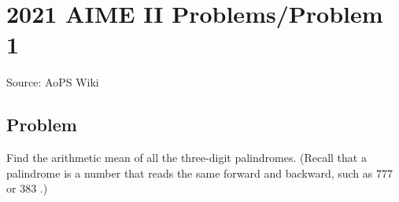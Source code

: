 \documentclass[12pt]{article}
\begin{document}
\section*{{2021 AIME II Problems/Problem 1}}
Source: AoPS Wiki

\subsection*{Problem}
Find the arithmetic mean of all the three-digit palindromes. (Recall that a palindrome is a number that reads the same forward and backward, such as $777$ or $383$ .)
\end{document}
